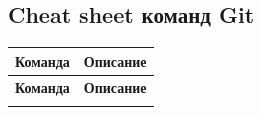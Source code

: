 \documentclass[14pt]{extarticle}
\begin{document}
\begin{landscape}

\pagestyle{empty}

\appendix

\section{Cheat sheet команд Git}

    \begin{xltabular}{\linewidth}{|X|X|}

        \hline
        \textbf{Команда} & \textbf{Описание} \\
        \hline
        \hline
        \endfirsthead

        \hline
        \textbf{Команда} & \textbf{Описание} \\
        \hline
        \hline
        \endhead

        \hline
        \endfoot

        \hline
        \endlastfoot


\end{xltabular}
\end{landscape}
\end{document}
